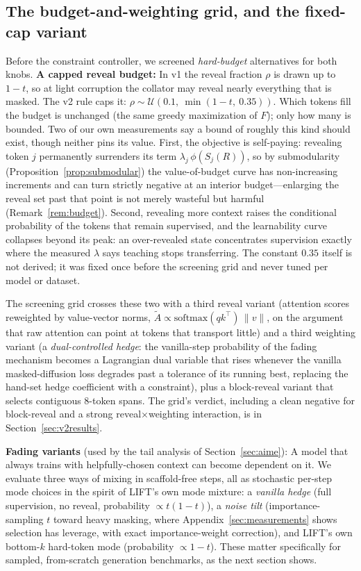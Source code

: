 \documentclass{article} %
\begin{document}
\subsection*{The budget-and-weighting grid, and the fixed-cap variant}
Before the constraint controller, we screened \emph{hard-budget} alternatives for both knobs. \textbf{A capped reveal budget:} In v1 the reveal fraction $\rho$ is drawn up to $1-t$, so at light corruption the collator may reveal nearly everything that is masked. The v2 rule caps it: $\rho \sim \mathcal{U}(0.1,\ \min(1-t,\ 0.35))$. Which tokens fill the budget is unchanged (the same greedy maximization of $F$); only how many is bounded. Two of our own measurements say a bound of roughly this kind should exist, though neither pins its value. First, the objective is self-paying: revealing token $j$ permanently surrenders its term $\lambda_j\,\phi(S_j(R))$, so by submodularity (Proposition~\ref{prop:submodular}) the value-of-budget curve has non-increasing increments and can turn strictly negative at an interior budget---enlarging the reveal set past that point is not merely wasteful but harmful (Remark~\ref{rem:budget}). Second, revealing more context raises the conditional probability of the tokens that remain supervised, and the learnability curve collapses beyond its peak: an over-revealed state concentrates supervision exactly where the measured $\lambda$ says teaching stops transferring. The constant $0.35$ itself is not derived; it was fixed once before the screening grid and never tuned per model or dataset.

The screening grid crosses these two with a third reveal variant (attention scores reweighted by value-vector norms, $\tilde A \propto \mathrm{softmax}(qk^\top)\,\lVert v\rVert$, on the argument that raw attention can point at tokens that transport little) and a third weighting variant (a \emph{dual-controlled hedge}: the vanilla-step probability of the fading mechanism becomes a Lagrangian dual variable that rises whenever the vanilla masked-diffusion loss degrades past a tolerance of its running best, replacing the hand-set hedge coefficient with a constraint), plus a block-reveal variant that selects contiguous 8-token spans. The grid's verdict, including a clean negative for block-reveal and a strong reveal$\times$weighting interaction, is in Section~\ref{sec:v2results}.

\textbf{Fading variants} (used by the tail analysis of Section~\ref{sec:aime}): A model that always trains with helpfully-chosen context can become dependent on it. We evaluate three ways of mixing in scaffold-free steps, all as stochastic per-step mode choices in the spirit of LIFT's own mode mixture: a \emph{vanilla hedge} (full supervision, no reveal, probability $\propto t(1-t)$), a \emph{noise tilt} (importance-sampling $t$ toward heavy masking, where Appendix~\ref{sec:measurements} shows selection has leverage, with exact importance-weight correction), and LIFT's own bottom-$k$ hard-token mode (probability $\propto 1-t$). These matter specifically for sampled, from-scratch generation benchmarks, as the next section shows.
\end{document}
